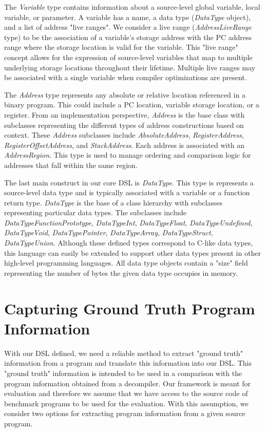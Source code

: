 The \emph{Variable} type contains information about a source-level global variable, local variable, or parameter. A variable has a name, a data type (\emph{DataType} object), and a list of address "live ranges". We consider a live range (\emph{AddressLiveRange} type) to be the association of a variable's storage address with the PC address range where the storage location is valid for the variable. This "live range" concept allows for the expression of source-level variables that map to multiple underlying storage locations throughout their lifetime. Multiple live ranges may be associated with a single variable when compiler optimizations are present.

The \emph{Address} type represents any absolute or relative location referenced in a binary program. This could include a PC location, variable storage location, or a register. From an implementation perspective, \emph{Address} is the base class with subclasses representing the different types of address constructions based on context. These \emph{Address} subclasses include \emph{AbsoluteAddress}, \emph{RegisterAddress}, \emph{RegisterOffsetAddress}, and \emph{StackAddress}. Each address is associated with an \emph{AddressRegion}. This type is used to manage ordering and comparison logic for addresses that fall within the same region.

The last main construct in our core DSL is \emph{DataType}. This type is represents a source-level data type and is typically associated with a variable or a function return type. \emph{DataType} is the base of a class hierarchy with subclasses representing particular data types. The subclasses include \emph{DataTypeFunctionPrototype}, \emph{DataTypeInt}, \emph{DataTypeFloat}, \emph{DataTypeUndefined}, \emph{DataTypeVoid}, \emph{DataTypePointer}, \emph{DataTypeArray}, \emph{DataTypeStruct}, \emph{DataTypeUnion}. Although these defined types correspond to C-like data types, this language can easily be extended to support other data types present in other high-level programming languages. All data type objects contain a "size" field representing the number of bytes the given data type occupies in memory.

\section{Capturing Ground Truth Program Information}

With our DSL defined, we need a reliable method to extract "ground truth" information from a program and translate this information into our DSL. This "ground truth" information is intended to be used in a comparison with the program information obtained from a decompiler. Our framework is meant for evaluation and therefore we assume that we have access to the source code of benchmark programs to be used for the evaluation. With this assumption, we consider two options for extracting program information from a given source program.

